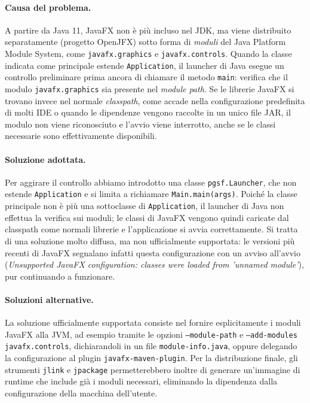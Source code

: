 \documentclass[11pt, a4paper]{article}
\begin{document}
	\paragraph{Causa del problema.}
	A partire da Java 11, JavaFX non è più incluso nel JDK, ma viene distribuito separatamente (progetto OpenJFX) sotto forma di \emph{moduli} del Java Platform Module System, come \texttt{javafx.graphics} e \texttt{javafx.controls}. Quando la classe indicata come principale estende \texttt{Application}, il launcher di Java esegue un controllo preliminare prima ancora di chiamare il metodo \texttt{main}: verifica che il modulo \texttt{javafx.graphics} sia presente nel \emph{module path}. Se le librerie JavaFX si trovano invece nel normale \emph{classpath}, come accade nella configurazione predefinita di molti IDE o quando le dipendenze vengono raccolte in un unico file JAR, il modulo non viene riconosciuto e l'avvio viene interrotto, anche se le classi necessarie sono effettivamente disponibili.
	
	\paragraph{Soluzione adottata.}
	Per aggirare il controllo abbiamo introdotto una classe \texttt{pgsf.Launcher}, che non estende \texttt{Application} e si limita a richiamare \texttt{Main.main(args)}. Poiché la classe principale non è più una sottoclasse di \texttt{Application}, il launcher di Java non effettua la verifica sui moduli; le classi di JavaFX vengono quindi caricate dal classpath come normali librerie e l'applicazione si avvia correttamente. Si tratta di una soluzione molto diffusa, ma non ufficialmente supportata: le versioni più recenti di JavaFX segnalano infatti questa configurazione con un avviso all'avvio (\emph{Unsupported JavaFX configuration: classes were loaded from 'unnamed module'}), pur continuando a funzionare.
	
	\paragraph{Soluzioni alternative.}
	La soluzione ufficialmente supportata consiste nel fornire esplicitamente i moduli JavaFX alla JVM, ad esempio tramite le opzioni \texttt{--module-path} e \texttt{--add-modules javafx.controls}, dichiarandoli in un file \texttt{module-info.java}, oppure delegando la configurazione al plugin \texttt{javafx-maven-plugin}. Per la distribuzione finale, gli strumenti \texttt{jlink} e \texttt{jpackage} permetterebbero inoltre di generare un'immagine di runtime che include già i moduli necessari, eliminando la dipendenza dalla configurazione della macchina dell'utente.
	
\end{document}
